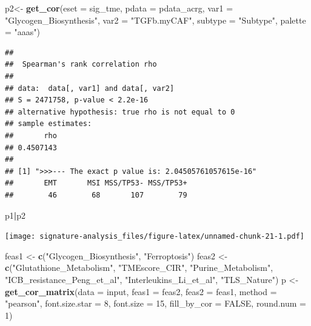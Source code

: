 \documentclass[
  12pt,
]{book}
\newenvironment{Shaded}{\begin{snugshade}}{\end{snugshade}}
\newcommand{\AttributeTok}[1]{\textcolor[rgb]{0.13,0.29,0.53}{#1}}
\newcommand{\ConstantTok}[1]{\textcolor[rgb]{0.56,0.35,0.01}{#1}}
\newcommand{\DecValTok}[1]{\textcolor[rgb]{0.00,0.00,0.81}{#1}}
\newcommand{\FunctionTok}[1]{\textcolor[rgb]{0.13,0.29,0.53}{\textbf{#1}}}
\newcommand{\NormalTok}[1]{#1}
\newcommand{\OtherTok}[1]{\textcolor[rgb]{0.56,0.35,0.01}{#1}}
\newcommand{\SpecialCharTok}[1]{\textcolor[rgb]{0.81,0.36,0.00}{\textbf{#1}}}
\newcommand{\StringTok}[1]{\textcolor[rgb]{0.31,0.60,0.02}{#1}}
\begin{document}
\begin{Shaded}
\begin{Highlighting}[]
\NormalTok{p2}\OtherTok{\textless{}{-}} \FunctionTok{get\_cor}\NormalTok{(}\AttributeTok{eset =}\NormalTok{ sig\_tme, }\AttributeTok{pdata =}\NormalTok{ pdata\_acrg, }\AttributeTok{var1 =} \StringTok{"Glycogen\_Biosynthesis"}\NormalTok{, }\AttributeTok{var2 =} \StringTok{"TGFb.myCAF"}\NormalTok{, }\AttributeTok{subtype =} \StringTok{"Subtype"}\NormalTok{, }\AttributeTok{palette =} \StringTok{"aaas"}\NormalTok{)}
\end{Highlighting}
\end{Shaded}

\begin{verbatim}
## 
##  Spearman's rank correlation rho
## 
## data:  data[, var1] and data[, var2]
## S = 2471758, p-value < 2.2e-16
## alternative hypothesis: true rho is not equal to 0
## sample estimates:
##       rho 
## 0.4507143 
## 
## [1] ">>>--- The exact p value is: 2.04505761057615e-16"
##       EMT       MSI MSS/TP53- MSS/TP53+ 
##        46        68       107        79
\end{verbatim}

\begin{Shaded}
\begin{Highlighting}[]
\NormalTok{p1}\SpecialCharTok{|}\NormalTok{p2}
\end{Highlighting}
\end{Shaded}

\texttt{[image: signature-analysis\_files/figure-latex/unnamed-chunk-21-1.pdf]}

\begin{Shaded}
\begin{Highlighting}[]
\NormalTok{feas1 }\OtherTok{\textless{}{-}} \FunctionTok{c}\NormalTok{(}\StringTok{"Glycogen\_Biosynthesis"}\NormalTok{, }\StringTok{"Ferroptosis"}\NormalTok{)}
\NormalTok{feas2 }\OtherTok{\textless{}{-}} \FunctionTok{c}\NormalTok{(}\StringTok{"Glutathione\_Metabolism"}\NormalTok{, }\StringTok{"TMEscore\_CIR"}\NormalTok{, }\StringTok{"Purine\_Metabolism"}\NormalTok{, }\StringTok{"ICB\_resistance\_Peng\_et\_al"}\NormalTok{, }\StringTok{"Interleukins\_Li\_et\_al"}\NormalTok{, }\StringTok{"TLS\_Nature"}\NormalTok{)}
\NormalTok{p }\OtherTok{\textless{}{-}} \FunctionTok{get\_cor\_matrix}\NormalTok{(}\AttributeTok{data           =}\NormalTok{ input, }
                    \AttributeTok{feas1          =}\NormalTok{ feas2, }
                    \AttributeTok{feas2          =}\NormalTok{ feas1,}
                    \AttributeTok{method         =} \StringTok{"pearson"}\NormalTok{,}
                    \AttributeTok{font.size.star =} \DecValTok{8}\NormalTok{, }
                    \AttributeTok{font.size      =} \DecValTok{15}\NormalTok{, }
                    \AttributeTok{fill\_by\_cor    =} \ConstantTok{FALSE}\NormalTok{, }
                    \AttributeTok{round.num      =} \DecValTok{1}\NormalTok{)}
\end{Highlighting}
\end{Shaded}
\end{document}
